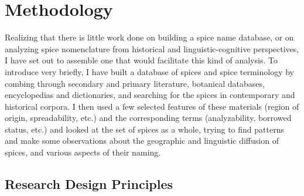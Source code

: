 

\chapter{Methodology}
\label{ch:methodology}


Realizing that there is little work done on building a spice name database, or on analyzing spice nomenclature from historical and linguistic-cognitive perspectives, I have set out to assemble one that would facilitate this kind of analysis. 
To introduce very briefly, I have built a database of spices and spice terminology by combing through secondary and primary literature, botanical databases, encyclopedias and dictionaries, and searching for the spices in contemporary and historical corpora. I then used a few selected features of these materials (region of origin, spreadability, etc.) and the corresponding terms (analyzability, borrowed status, etc.) and looked at the set of spices as a whole, trying to find patterns and make some observations about the geographic and linguistic diffusion of spices, and various aspects of their naming.


\section{Research Design Principles}


